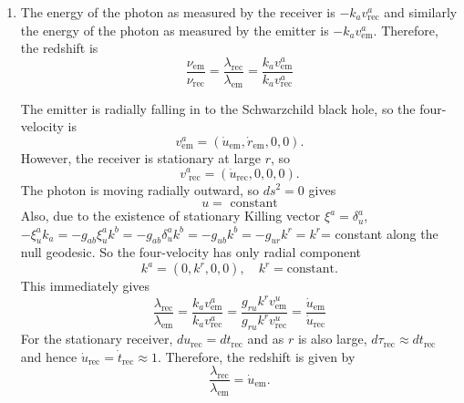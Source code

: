 \documentclass{article}
\begin{document}
\begin{enumerate}
\begin{enumerate}
\item
The energy of the photon as measured by the receiver is $-k_a v_\textrm{rec}^a$ and similarly the energy of the photon as measured by the emitter is $-k_a v^a_\textrm{em}$. Therefore, the redshift is
\begin{equation}
  \label{eq:redshift-in-energy}
  \frac{\nu_\textrm{em}}{\nu_\textrm{rec}} = \frac{\lambda_{\text{rec}}}{\lambda_{\text{em}}} = \frac{k_a v^a_\textrm{em}}{k_a v^a_\textrm{rec}}
\end{equation}

The emitter is radially falling in to the Schwarzchild black hole, so the four-velocity is
\begin{equation}
  \label{eq:v-em}
  v^a_\textrm{em} = (\dot{u}_{\text{em}},\dot{r}_{\text{em}},0,0). 
\end{equation}
However, the receiver is stationary at large $r$, so
\begin{equation}
  \label{eq:v-rec}
  v^a_\textrm{ rec} = (\dot{u}_{\text{rec}},0,0,0).
\end{equation}
The photon is moving radially outward, so $ds^2 = 0$ gives
\begin{equation}
  \label{eq:k-photon}
  u = \textrm{ constant}
\end{equation}
Also, due to the existence of stationary Killing vector $\xi^a = \delta^a_u$, $-\xi^a_u k_a = -g_{ab} \xi^a_u k^b = -g_{ab}\delta^a_u k^b = -g_{ub}k^b = -g_{ur}k^r = k^r$= constant along the null geodesic. So the four-velocity has only radial component
\begin{equation}
  \label{eq:v-k}
  k^a = (0,k^r,0,0), \quad k^r=\textrm{constant}.
\end{equation}
This immediately gives
\begin{equation}
  \label{eq:redshift}
  \frac{\lambda_{\text{rec}}}{\lambda_{\text{em}}} = \frac{k_a v^a_\textrm{em}}{k_a v^a_\textrm{rec}} = \frac{g_{ru}k^r  v^u_\textrm{em}}{g_{ru}k^r v^u_\textrm{rec}} = \frac{\dot{u}_\textrm{em}}{\dot{u}_\textrm{rec}}  
\end{equation}
For the stationary receiver, $du_\textrm{rec} = dt_\textrm{rec}$ and as $r$ is also large, $d\tau_\textrm{rec} \approx dt_\textrm{rec}$ and hence $\dot{u}_\textrm{rec} = \dot{t}_\textrm{rec} \approx 1 $. Therefore, the redshift is given by
\begin{equation}
  \label{eq:redshift-u-dot}
  \frac{\lambda_{\text{rec}}}{\lambda_{\text{em}}} = \dot{u}_\textrm{em}.
\end{equation}


\end{enumerate}
\end{enumerate}
\end{document}
